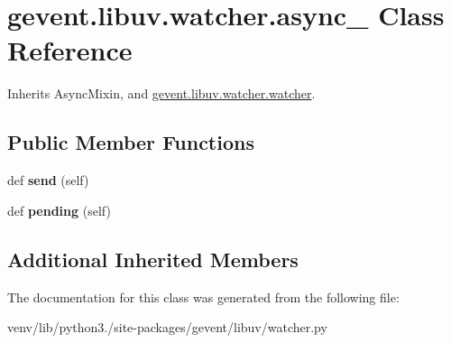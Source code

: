 \hypertarget{classgevent_1_1libuv_1_1watcher_1_1async__}{}\section{gevent.\+libuv.\+watcher.\+async\+\_\+ Class Reference}
\label{classgevent_1_1libuv_1_1watcher_1_1async__}


Inherits Async\+Mixin, and \hyperlink{classgevent_1_1libuv_1_1watcher_1_1watcher}{gevent.\+libuv.\+watcher.\+watcher}.

\subsection*{Public Member Functions}
\begin{DoxyCompactItemize}
\item 
\mbox{\label{classgevent_1_1libuv_1_1watcher_1_1async___ab4103b2ccf3740a7f26b8559df51cbc1}} 
def {\bfseries send} (self)
\item 
\mbox{\label{classgevent_1_1libuv_1_1watcher_1_1async___adcdda89c6982e5989a4aa1a174892bba}} 
def {\bfseries pending} (self)
\end{DoxyCompactItemize}
\subsection*{Additional Inherited Members}


The documentation for this class was generated from the following file\+:\begin{DoxyCompactItemize}
\item 
venv/lib/python3./site-\/packages/gevent/libuv/watcher.\+py\end{DoxyCompactItemize}

